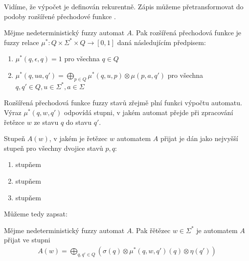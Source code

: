 \documentclass[a4paper,10pt]{article}
\begin{document}
Vidíme, že výpočet je definován rekurentně. Zápis můžeme přetransformovat do podoby rozšířené přechodové funkce \cite{IgnCirBog-DetFuzAutMemValComResLat}.

\begin{definition}\label{def-RozPreFunFuzzStav}
 Mějme nedeterministický fuzzy automat $A$. Pak rozšířená přechodová funkce je fuzzy relace $\mu^*: Q \times \Sigma^* \times Q \rightarrow [0,1]$ daná následujícím předpisem:
 
 \begin{enumerate}
  \item $\mu^*(q, \epsilon, q) = 1$ pro všechna $q \in Q$
  \item $\mu^*(q, u a, q') =  \bigoplus_{p \in Q} \mu^*(q, u, p) \otimes \mu(p, a, q')$ pro všechna $q, q' \in Q, u \in \Sigma^*, a \in \Sigma$
 \end{enumerate}
\end{definition}

Rozšířená přechodová funkce fuzzy stavů zřejmě plní funkci výpočtu automatu. Výraz $\mu^*(q, w, q')$ odpovídá stupni, v jakém automat přejde při zpracování řetězce $w$ ze stavu $q$ do stavu $q'$. 

Stupeň $A(w)$, v jakém je řetězec $w$ automatem $A$ přijat je dán jako nejvyšší stupeň pro všechny dvojice stavů $p, q$:
\begin{enumerate}
 \item stupňem 
 \item stupňem 
 \item stupňem 
\end{enumerate}

Můžeme tedy zapsat:

\begin{definition}\label{def-RetPriAut}
 Mějme nedeterministický fuzzy automat $A$. Pak řětězec $w \in \Sigma^*$ je automatem $A$ přijat ve stupni
 \begin{align} \label{eq-RetPriAut}
  A(w) = \bigoplus_{q, q' \in Q} (\sigma(q) \otimes \mu^*(q, w, q')(q) \otimes \eta(q'))
 \end{align}
\end{definition}
\end{document}
